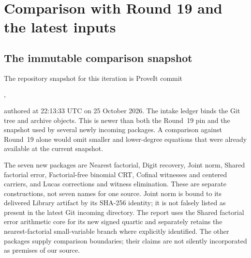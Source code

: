 \section{Comparison with Round 19 and the latest inputs}
\label{sec:comparison}
\subsection{The immutable comparison snapshot}
The repository snapshot for this iteration is ProveIt commit
\begin{center}\small
{},
\end{center}
authored at 22:13:33 UTC on 25 October 2026. The intake ledger binds the
Git tree and archive objects. This is newer than both the Round~19 pin
 and the
 snapshot used by
several newly incoming packages. A comparison against Round~19 alone
would omit smaller and lower-degree equations that were already available
at the current snapshot.

The seven new packages are Nearest factorial, Digit recovery, Joint norm,
Shared factorial error, Factorial-free binomial CRT, Cofinal witnesses and
centered carriers, and Lucas corrections and witness elimination. These
are separate constructions, not seven names for one source. Joint norm
is bound to its delivered Library artifact by its SHA-256 identity; it
is not falsely listed as present in the latest Git incoming directory. The report
uses the Shared factorial error arithmetic core for its new signed quartic
and separately retains the nearest-factorial small-variable branch where
explicitly identified. The other packages supply comparison boundaries;
their claims are not silently incorporated as premises of our source.

